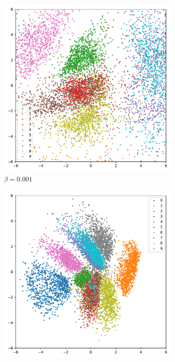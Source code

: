 \begin{figure}[H]
\centering
\begin{subfigure}{.28\textwidth}
  \centering
  \includegraphics[width=\textwidth]{gfx/evaluation/feature_space/beta=0.001.pdf}
  \caption{$\beta = 0.001$}
\end{subfigure}
\begin{subfigure}{.28\textwidth}
  \centering
  \includegraphics[width=\textwidth]{gfx/evaluation/feature_space/beta=0.1.pdf}

\end{subfigure}
\end{figure}
